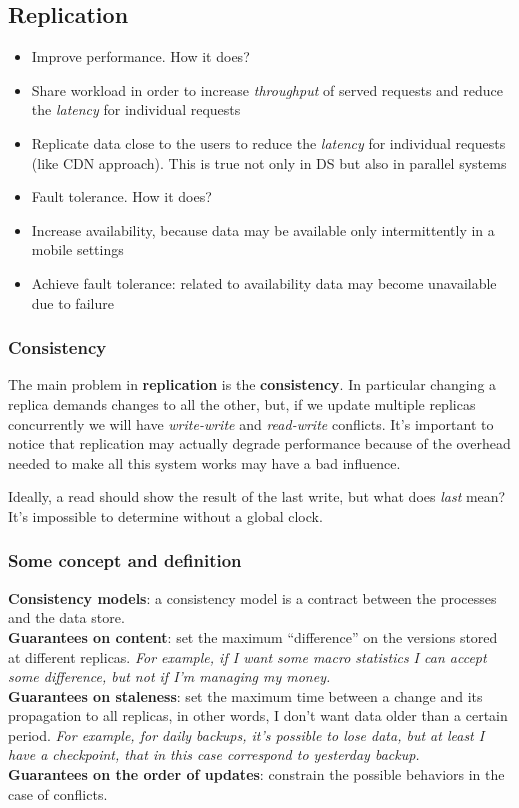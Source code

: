 \subsection{Replication}

\begin{itemize}
    \item
      Improve performance. How it does?
    \item
      Share workload in order to increase \emph{throughput} of served
      requests and reduce the \emph{latency} for individual requests
    \item
      Replicate data close to the users to reduce the \emph{latency} for
      individual requests (like CDN approach). This is true not only in DS
      but also in parallel systems
    \item
      Fault tolerance. How it does?
    \item
      Increase availability, because data may be available only
      intermittently in a mobile settings
    \item
      Achieve fault tolerance: related to availability data may become
      unavailable due to failure
\end{itemize}

\subsubsection{Consistency}

The main problem in \textbf{replication} is the \textbf{consistency}. In
particular changing a replica demands changes to all the other, but, if
we update multiple replicas concurrently we will have \emph{write-write}
and \emph{read-write} conflicts. It's important to notice that replication 
may actually degrade performance because of the overhead needed to make all 
this system works may have a bad influence.

Ideally, a read should show the result of the last write, but what does
\emph{last} mean? It's impossible to determine without a global clock.\\

\subsubsection{Some concept and definition}

\textbf{Consistency models}: a consistency model is a contract between
the processes and the data store.\\
\textbf{Guarantees on content}: set the maximum ``difference'' on the
versions stored at different replicas. \emph{For example, if I want some
macro statistics I can accept some difference, but not if I'm managing
my money.}\\
\textbf{Guarantees on staleness}: set the maximum time between a change
and its propagation to all replicas, in other words, I don't want data
older than a certain period. \emph{For example, for daily backups, it's
possible to lose data, but at least I have a checkpoint, that in this
case correspond to yesterday backup.}\\
\textbf{Guarantees on the order of updates}: constrain the possible
behaviors in the case of conflicts.

